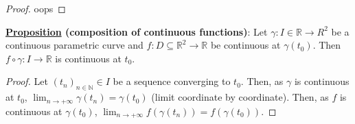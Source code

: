 \documentclass[10pt]{extarticle}
\newcommand{\R}{\mathbb{R}}
\newcommand{\N}{\mathbb{N}}
\begin{document}
\begin{proof}
    oops
\end{proof}

\textbf{\underline{Proposition} (composition of continuous functions)}:
Let $\gamma: I \in \R \to R^2$ be a continuous parametric curve and $f: D \subseteq \R^2 \to \R$ be continuous at $\gamma(t_0)$.
Then $f \circ \gamma: I \to \R$ is continuous at $t_0$.

\begin{proof}
    Let $\left(t_n\right)_{n \in \N} \in I$ be a sequence converging to $t_0$.
    Then, as $\gamma$ is continuous at $t_0$, $\lim_{n \to +\infty} \gamma(t_n) = \gamma(t_0)$ (limit coordinate by coordinate).
    Then, as $f$ is continuous at $\gamma(t_0)$, $\lim_{n \to +\infty} f(\gamma(t_n)) = f(\gamma(t_0))$.
\end{proof}
\end{document}
